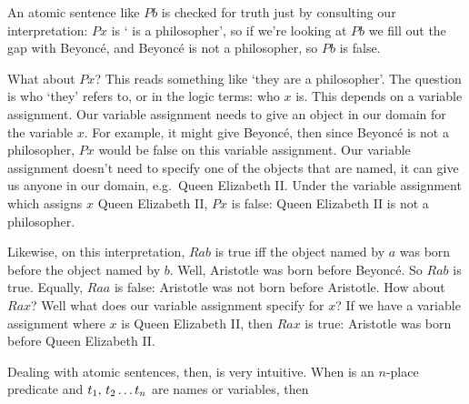 An atomic sentence like $Pb$ is checked for truth just by consulting our interpretation: $Px$ is ` is a philosopher', so if we're looking at $Pb$ we fill out the gap with  Beyonc\'e, and  Beyonc\'e is not a philosopher, so $Pb$ is false.

What about $Px$? This reads something like `they are a philosopher'. The question is who `they' refers to, or in the logic terms: who $x$ is. This depends on a variable assignment. Our variable assignment needs to give an object in our domain for the variable $x$. For example, it might give Beyonc\'e, then since Beyonc\'e is not a philosopher, $Px$ would be false on this variable assignment. Our variable assignment doesn't need to specify one of the objects that are named, it can give us anyone in our domain, e.g.~Queen Elizabeth II. Under the variable assignment which assigns $x$ Queen Elizabeth II, $Px$ is false: Queen Elizabeth II is not a philosopher.


Likewise, on this interpretation, $Rab$ is true iff the object named by $a$ was born before the object named by $b$. Well, Aristotle was born before Beyonc\'e. So $Rab$ is true. Equally, $Raa$ is false: Aristotle was not born before Aristotle. How about $Rax$? Well what does our variable assignment specify for $x$? If we have a variable assignment where $x$ is Queen Elizabeth II, then $Rax$ is true: Aristotle was born before Queen Elizabeth II.

Dealing with atomic sentences, then, is very intuitive. When  is an $n$-place predicate and $t_1,\,t_2\ldots t_{n}$ are names or variables, then




